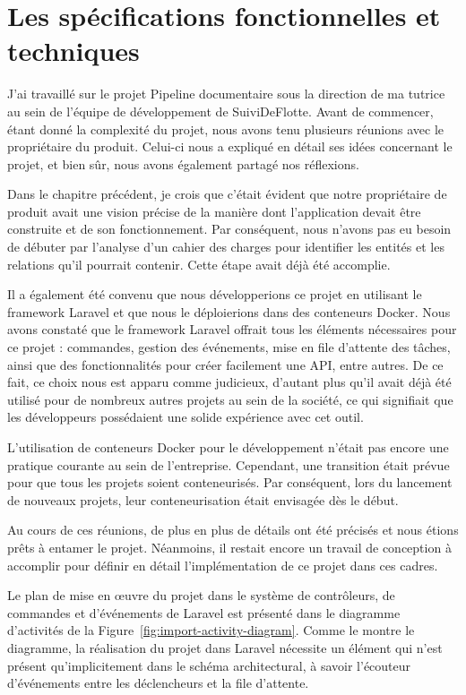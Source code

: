 \chapter[Spécifications fonctionnelles et techniques]{Les spécifications fonctionnelles et techniques}\label{ch:specifications-fonctionnelles-techniques}

J'ai travaillé sur le projet Pipeline documentaire sous la direction de ma tutrice au sein de l'équipe de développement de SuiviDeFlotte. Avant de commencer, étant donné la complexité du projet, nous avons tenu plusieurs réunions avec le propriétaire du produit. Celui-ci nous a expliqué en détail ses idées concernant le projet, et bien sûr, nous avons également partagé nos réflexions.

Dans le chapitre précédent, je crois que c'était évident que notre propriétaire de produit avait une vision précise de la manière dont l'application devait être construite et de son fonctionnement. Par conséquent, nous n'avons pas eu besoin de débuter par l'analyse d'un cahier des charges pour identifier les entités et les relations qu'il pourrait contenir. Cette étape avait déjà été accomplie.

Il a également été convenu que nous développerions ce projet en utilisant le framework Laravel et que nous le déploierions dans des conteneurs Docker. Nous avons constaté que le framework Laravel offrait tous les éléments nécessaires pour ce projet : commandes, gestion des événements, mise en file d'attente des tâches, ainsi que des fonctionnalités pour créer facilement une API, entre autres. De ce fait, ce choix nous est apparu comme judicieux, d'autant plus qu'il avait déjà été utilisé pour de nombreux autres projets au sein de la société, ce qui signifiait que les développeurs possédaient une solide expérience avec cet outil.

L'utilisation de conteneurs Docker pour le développement n'était pas encore une pratique courante au sein de l'entreprise. Cependant, une transition était prévue pour que tous les projets soient conteneurisés. Par conséquent, lors du lancement de nouveaux projets, leur conteneurisation était envisagée dès le début.

Au cours de ces réunions, de plus en plus de détails ont été précisés et nous étions prêts à entamer le projet. Néanmoins, il restait encore un travail de conception à accomplir pour définir en détail l'implémentation de ce projet dans ces cadres.

Le plan de mise en œuvre du projet dans le système de contrôleurs, de commandes et d'événements de Laravel est présenté dans le diagramme d'activités de la Figure~\ref{fig:import-activity-diagram}. Comme le montre le diagramme, la réalisation du projet dans Laravel nécessite un élément qui n'est présent qu'implicitement dans le schéma architectural, à savoir l'écouteur d'événements entre les déclencheurs et la file d'attente.


